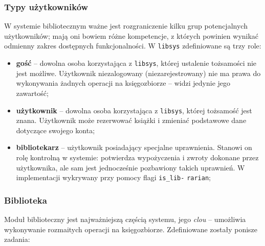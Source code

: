 \documentclass[12pt, a4paper]{article}
\begin{document}
\subsubsection{Typy użytkowników}
W systemie bibliotecznym ważne jest rozgraniczenie kilku grup potencjalnych użytkowników; mają oni bowiem różne kompetencje, z których powinien wynikać odmienny zakres dostępnych funkcjonalności. W \texttt{libsys} zdefiniowane są trzy role:

\begin{itemize}
    \label{libsys_roles}
    \item \textbf{gość} -- dowolna osoba korzystająca z \texttt{libsys}, której ustalenie tożsamości nie jest możliwe. Użytkownik niezalogowany (niezarejestrowany) nie ma prawa do wykonywania żadnych operacji na księgozbiorze -- widzi jedynie jego zawartość;
    \item \textbf{użytkownik} -- dowolna osoba korzystająca z \texttt{libsys}, której tożsamość jest znana. Użytkownik może rezerwować książki i zmieniać podstawowe dane dotyczące swojego konta;
    \item \textbf{bibliotekarz} -- użytkownik posiadający specjalne uprawnienia. Stanowi on rolę kontrolną w systemie: potwierdza wypożyczenia i zwroty dokonane przez użytkownika, ale sam jest jednocześnie pozbawiony takich uprawnień. W implementacji wykrywany przy pomocy flagi \texttt{is\_lib-} \texttt{rarian};
\end{itemize}

\subsubsection{Biblioteka}
Moduł biblioteczny jest najważniejszą częścią systemu, jego \textit{clou} -- umożliwia wykonywanie rozmaitych operacji na księgozbiorze. Zdefiniowane zostały ponisze zadania:
\end{document}

